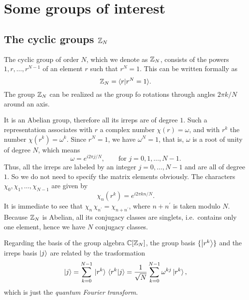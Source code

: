 \chapter{Some groups of interest}
\label{sec:some groups of interest}

%
%
\section{The cyclic groups \texorpdfstring{$\mathbb{Z}_N$}{ZN}}
\label{app:the_cyclic_groups}


The cyclic group of order $N$, which we denote as $\mathbb{Z}_N$, consists of the powers $1, r, \dots, r^{N-1}$ of an element $r$ such that $r^N = 1$.
This can be written formally as
\begin{equation}
    \mathbb{Z}_N = \langle r | r^N = 1 \rangle.
\end{equation}
The group $\mathbb{Z}_N$ can be realized as the group fo rotations through angles $2 \pi k / N$ around an axis.

It is an Abelian group, therefore all its irreps are of degree $1$.
Such a representation associates with $r$ a complex number $\chi(r) = \omega$, and with $r^k$ the number $\chi(r^k) = \omega^k $.
Since $r^N = 1$, we have $\omega^N = 1$, that is, $\omega$ is a root of unity of degree $N$, which means
\begin{equation}
    \omega = e^{i 2 \pi j / N}, \qquad
    \text{for~} j = 0, 1, \dots, N-1.
\end{equation}
Thus, all the irreps are labeled by an integer $j = 0, \dots, N-1$ and are all of degree $1$.
So we do not need to specify the matrix elements obviously.
The characters $\chi_0, \chi_1, \dots, \chi_{N-1}$ are given by
\begin{equation}
    \chi_n(r^k) = e^{i 2 \pi k n / N}.
\end{equation}
It is immediate to see that $\chi_n \, \chi_{n^{\prime}} = \chi_{n + n^{\prime}}$, where $n + n^{\prime}$ is taken modulo $N$.
Because $\mathbb{Z}_N$ is Abelian, all its conjugacy classes are singlets, i.e.~contains only one element, hence we have $N$ conjugacy classes.

Regarding the basis of the group algebra $\mathbb{C}[\mathbb{Z}_N]$, the group basis $\{\ket{r^k}\}$ and the irreps basis $\ket{j}$ are related by the trasformation
\begin{equation}
    \ket{j}
    = \sum_{k = 0}^{N-1} \ket*{r^k} \braket*{r^k}{j}
    = \frac{1}{\sqrt{N}} \sum_{k = 0}^{N-1} \omega^{kj} \ket*{r^k},
\end{equation}
which is just the \emph{quantum Fourier transform}.


